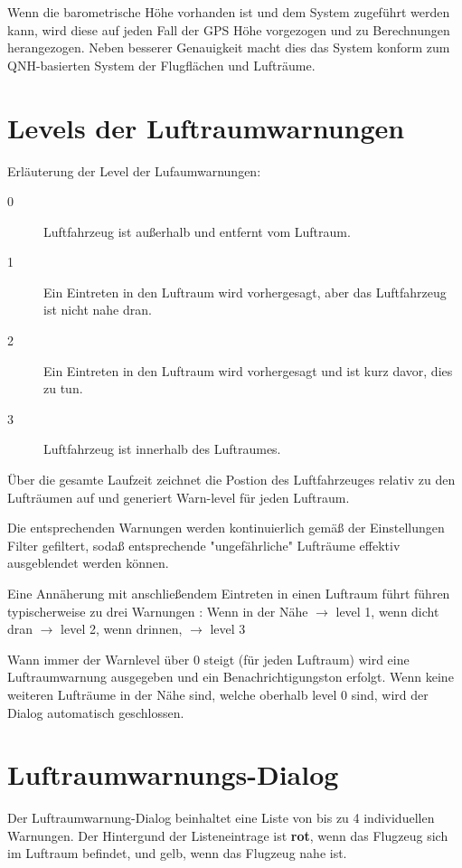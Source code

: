 Wenn die barometrische Höhe vorhanden ist und dem System zugeführt werden kann, wird diese auf
jeden Fall der GPS Höhe vorgezogen und zu Berechnungen herangezogen.
Neben besserer Genauigkeit macht dies das System konform zum QNH-basierten System der
Flugflächen und Lufträume.

\section{Levels der Luftraumwarnungen}\label{airspace-level}

Erläuterung der Level der Lufaumwarnungen:
\begin{description}
\item[0] Luftfahrzeug ist außerhalb und entfernt vom Luftraum.
\item[1] Ein Eintreten in den Luftraum wird vorhergesagt, aber das Luftfahrzeug ist nicht nahe dran.
\item[2] Ein Eintreten in den Luftraum wird vorhergesagt und ist kurz davor, dies zu tun.
\item[3] Luftfahrzeug ist innerhalb des Luftraumes.
\end{description}

Über die gesamte Laufzeit zeichnet \xc die Postion des Luftfahrzeuges  relativ zu den
Lufträumen auf und generiert Warn-level für jeden Luftraum.

Die entsprechenden Warnungen werden kontinuierlich gemäß der Einstellungen
Filter gefiltert, sodaß entsprechende "ungefährliche" Lufträume effektiv ausgeblendet
 werden können.

Eine Annäherung mit anschließendem Eintreten in einen Luftraum führt führen typischerweise zu drei Warnungen :
Wenn in der Nähe $\rightarrow$ level 1, wenn dicht dran $\rightarrow$ level 2, wenn drinnen, $\rightarrow$ level 3

Wann immer der Warnlevel über 0 steigt (für jeden Luftraum) wird eine
Luftraumwarnung ausgegeben und ein Benachrichtigungston erfolgt.
Wenn keine weiteren Lufträume in der Nähe sind, welche oberhalb level 0 sind,
wird der Dialog automatisch geschlossen.


\section{Luftraumwarnungs-Dialog}

Der Luftraumwarnung-Dialog beinhaltet eine Liste von bis zu 4 individuellen  Warnungen.
Der Hintergund der Listeneintrage ist \textcolor[rgb]{0.97,0.17,0.19}{\textbf{rot}}, wenn das Flugzeug
sich im Luftraum befindet, und gelb, wenn das Flugzeug nahe ist.

